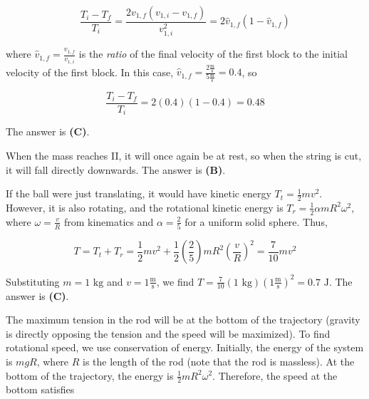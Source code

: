 \documentclass[12pt]{article}
\begin{document}
$$\frac{T_i - T_f}{T_i} = \frac{2 v_{1, f} (v_{1, i} - v_{1, f})}{v_{1, i}^2} = 2 \hat{v}_{1, f} (1 - \hat{v}_{1, f})$$

where $\hat{v}_{1, f} = \frac{v_{1, f}}{v_{1, i}}$ is the \textit{ratio} of the final velocity of the first block to the initial velocity of the first block. In this case, $\hat{v}_{1, f} = \frac{2 \frac{\text{m}}{\text{s}}}{5 \frac{\text{m}}{\text{s}}} = 0.4$, so

$$\frac{T_i - T_f}{T_i} = 2 (0.4) (1 - 0.4) = 0.48$$

The answer is \textbf{(C)}.


\vspace{2 \baselineskip}



When the mass reaches II, it will once again be at rest, so when the string is cut, it will fall directly downwards. The answer is \textbf{(B)}.


\vspace{2 \baselineskip}



If the ball were just translating, it would have kinetic energy $T_t = \frac{1}{2} m v^2$. However, it is also rotating, and the rotational kinetic energy is $T_r = \frac{1}{2} \alpha m R^2 \omega^2$, where $\omega = \frac{v}{R}$ from kinematics and $\alpha = \frac{2}{5}$ for a uniform solid sphere. Thus,

$$T = T_t + T_r = \frac{1}{2} m v^2 + \frac{1}{2} \left( \frac{2}{5} \right) m R^2 \left( \frac{v}{R} \right)^2 = \frac{7}{10} m v^2$$

Substituting $m = 1 \text{ kg}$ and $v = 1 \frac{\text{m}}{\text{s}}$, we find $T = \frac{7}{10} (1 \text{ kg}) \left( 1 \frac{\text{m}}{\text{s}} \right)^2 = 0.7 \text{ J}$. The answer is \textbf{(C)}.


\vspace{2 \baselineskip}



The maximum tension in the rod will be at the bottom of the trajectory (gravity is directly opposing the tension and the speed will be maximized). To find rotational speed, we use conservation of energy. Initially, the energy of the system is $m g R$, where $R$ is the length of the rod (note that the rod is massless). At the bottom of the trajectory, the energy is $\frac{1}{2} m R^2 \omega^2$. Therefore, the speed at the bottom satisfies
\end{document}

